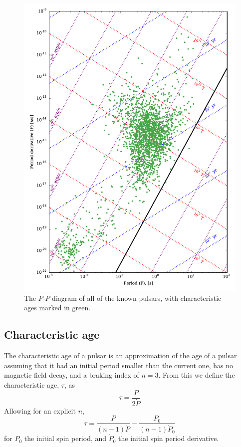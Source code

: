\begin{figure}
\includegraphics{figures/ppdot.pdf}
\caption{The $P$-$\dot{P}$ diagram of all of the known pulsars, with characteristic ages marked in green.}
\label{fig:ppdot}
\end{figure}

\subsection{Characteristic age}
\label{sec:characteristic-age}

The characteristic age of a pulsar is an approximation of the age of a
pulsar assuming that it had an initial period smaller than the current
one, has no magnetic field decay, and a braking index of $n=3$. From
this we define the characteristic age, $\tau$, as
\begin{equation}
  \label{eq:95}
  \tau = \frac{P}{2 \dot{P}}
\end{equation}
Allowing for an explicit $n$,
\begin{equation}
  \label{eq:96}
  \tau = \frac{P}{(n-1) \dot{P}} - \frac{P_0}{(n-1) \dot{P}_0}
\end{equation}
for $P_0$ the initial spin period, and $\dot{P}_0$ the initial spin
period derivative.


